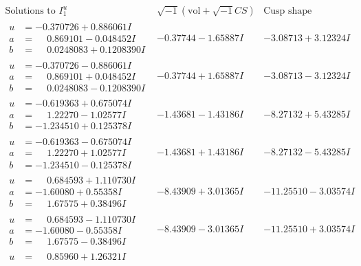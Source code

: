 \documentclass[1p]{elsarticle_modified}
\theoremstyle{definition}
\newcommand{\I}{\sqrt{-1}}
\begin{document}
$$\begin{array}{c|c|c}  
\text{Solutions to }I^u_{1}& \I (\text{vol} + \sqrt{-1}CS) & \text{Cusp shape}\\
 \hline 
\begin{aligned}
u &= -0.370726 + 0.886061 I \\
a &= \phantom{-}0.869101 - 0.048452 I \\
b &= \phantom{-}0.0248083 + 0.1208390 I\end{aligned}
 & -0.37744 - 1.65887 I & -3.08713 + 3.12324 I \\ \hline\begin{aligned}
u &= -0.370726 - 0.886061 I \\
a &= \phantom{-}0.869101 + 0.048452 I \\
b &= \phantom{-}0.0248083 - 0.1208390 I\end{aligned}
 & -0.37744 + 1.65887 I & -3.08713 - 3.12324 I \\ \hline\begin{aligned}
u &= -0.619363 + 0.675074 I \\
a &= \phantom{-}1.22270 - 1.02577 I \\
b &= -1.234510 + 0.125378 I\end{aligned}
 & -1.43681 - 1.43186 I & -8.27132 + 5.43285 I \\ \hline\begin{aligned}
u &= -0.619363 - 0.675074 I \\
a &= \phantom{-}1.22270 + 1.02577 I \\
b &= -1.234510 - 0.125378 I\end{aligned}
 & -1.43681 + 1.43186 I & -8.27132 - 5.43285 I \\ \hline\begin{aligned}
u &= \phantom{-}0.684593 + 1.110730 I \\
a &= -1.60080 + 0.55358 I \\
b &= \phantom{-}1.67575 + 0.38496 I\end{aligned}
 & -8.43909 + 3.01365 I & -11.25510 - 3.03574 I \\ \hline\begin{aligned}
u &= \phantom{-}0.684593 - 1.110730 I \\
a &= -1.60080 - 0.55358 I \\
b &= \phantom{-}1.67575 - 0.38496 I\end{aligned}
 & -8.43909 - 3.01365 I & -11.25510 + 3.03574 I \\ \hline\begin{aligned}
u &= \phantom{-}0.85960 + 1.26321 I \\

\end{aligned}
\end{array}$$
\end{document}
